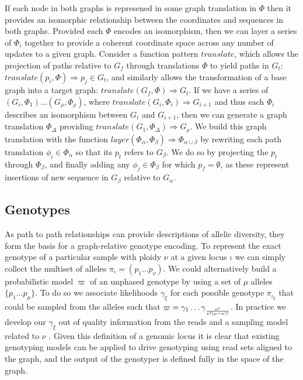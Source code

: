 If each node in both graphs is represened in some graph translation in $\Phi$ then it provides an isomorphic relationship between the coordinates and sequences in both graphs.
Provided each $\Phi$ encodes an isomorphism, then we can layer a series of $\Phi_i$ together to provide a coherent coordinate space across any number of updates to a given graph.
Consider a function pattern $translate$, which allows the projection of paths relative to $G_f$ through translations $\Phi$ to yield paths in $G_t$: $translate(p_i, \Phi) \Rightarrow p_j \in G_t$, and similarly allows the transformation of a base graph into a target graph: $translate(G_f, \Phi) \Rightarrow G_t$.
If we have a series of $(G_i, \Phi_1) \ldots (G_\rho, \Phi_\rho)$, where $translate(G_i, \Phi_i) \Rightarrow G_{i+1}$ and thus each $\Phi_i$ describes an isomorphism between $G_i$ and $G_{i+1}$, then we can generate a graph translation $\Phi_\Delta$ providing $translate(G_1, \Phi_\Delta) \Rightarrow G_\rho$.
We build this graph translation with the function $layer(\Phi_\alpha, \Phi_\beta) \Rightarrow \Phi_{\alpha \cup \beta}$ by rewriting each path translation $\phi_i \in \Phi_\alpha$ so that its $p_t$ refers to $G_\beta$.
We do so by projecting the $p_t$ through $\Phi_\beta$, and finally adding any $\phi_j \in \Phi_\beta$ for which $p_f = \emptyset$, as these represent insertions of new sequence in $G_\beta$ relative to $G_\alpha$.

\subsection{Genotypes}
\label{sec:genotypes}

As path to path relationships can provide descriptions of allelic diversity, they form the basis for a graph-relative genotype encoding.
To represent the exact genotype of a particular sample with ploidy $\nu$ at a given locus $\iota$ we can simply collect the multiset of alleles $\pi_\iota = ( p_1 \ldots p_\nu)$.
We could alternatively build a probabilistic model $\varpi$ of an unphased genotype by using a set of $\mu$ alleles $\{ p_1 \ldots p_\mu\}$.
To do so we associate likelihoods $\gamma_\xi$ for each possible genotype $\pi_{\iota_\xi}$ that could be sampled from the alleles such that $\varpi = \gamma_1 \ldots \gamma_{\mu! \over{\nu!(\mu-\nu)!} }$.
In practice we develop our $\gamma_\xi$ out of quality information from the reads and a sampling model related to $\nu$ \cite{garrison2012haplotype,li2011stats}.
Given this definition of a genomic locus it is clear that existing genotyping models can be applied to drive genotyping using read sets aligned to the graph, and the output of the genotyper is defined fully in the space of the graph.

